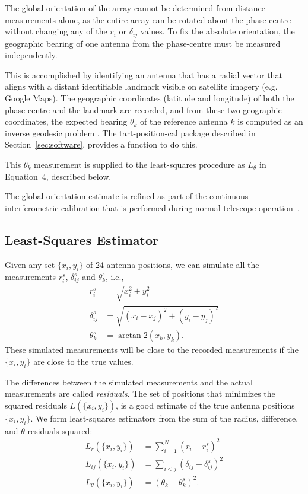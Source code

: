 \documentclass[twocolumn, a4paper,10pt]{article}
\begin{document}
The global orientation of the array cannot be determined from distance measurements alone, as the entire array can be rotated about the phase-centre without changing any of the $r_i$ or $\delta_{ij}$ values. To fix the absolute orientation, the geographic bearing of one antenna from the phase-centre must be measured independently.

This is accomplished by identifying an antenna that has a radial vector that aligns with a distant identifiable landmark visible on satellite imagery (e.g. Google Maps). The geographic coordinates (latitude and longitude) of both the phase-centre and the landmark are recorded, and from these two geographic coordinates, the expected bearing $\theta_k$ of the reference antenna $k$ is computed as an inverse geodesic problem . The tart-position-cal package described in Section~\ref{sec:software}, provides a function to do this.

This $\theta_k$ measurement is supplied to the least-squares procedure as $L_\theta$ in Equation~4, described below.

The global orientation estimate is refined as part of the continuous interferometric calibration that is performed during normal telescope operation~\cite{moltenocalibratoion}.


\subsection{Least-Squares Estimator}

Given any set $\{x_i, y_i\}$ of 24 antenna positions, we can simulate all the measurements $r_i^s$, $\delta_{ij}^s$ and $\theta_k^s$, i.e.,
\begin{align*}
	r^s_i         & =  \sqrt{x_i^2 + y_i^2}                \\
	\delta^s_{ij} & = \sqrt{(x_i - x_j)^2 + (y_i - y_j)^2} \\
	\theta^s_k    & = \arctan2\!\left(x_k, y_k\right).
\end{align*}
These simulated measurements will be close to the recorded measurements if the $\{x_i, y_i\}$ are close to the true values.

The differences between the simulated measurements and the actual measurements are called {\em residuals}. The set of positions that minimizes the squared residuals $L(\{x_i, y_i\})$, is a good estimate of the true antenna positions $\{x_i, y_i\}$. We form least-squares estimators from the sum of the radius, difference, and $\theta$ residuals squared:
\begin{align*}
	L_r(\{x_i, y_i\})      & = \sum_{i=1}^{N} \left( r_i - r^s_i \right)^2              \\
	L_{ij}(\{x_i, y_i\})   & = \sum_{i<j} \left( \delta_{ij} -  \delta^s_{ij} \right)^2 \\
	L_\theta(\{x_i, y_i\}) & = \left( \theta_k - \theta^s_k \right)^2.
\end{align*}
\end{document}
